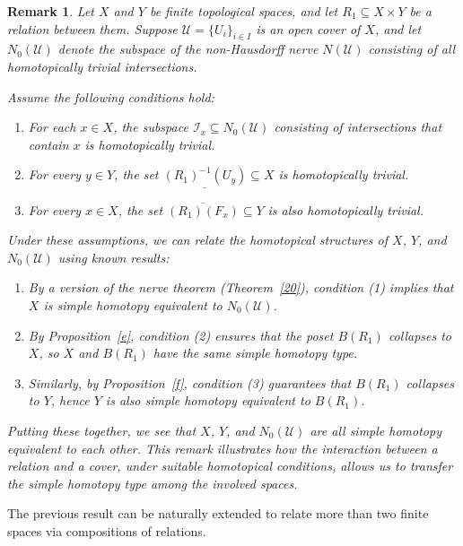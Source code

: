 \documentclass[12pt,a4paper,twoside, reqno, tbtags]{article}
\numberwithin{equation}{section}
\newtheorem{remark}{Remark}[section]
\begin{document}
\begin{remark}\label{22}
	Let \( X \) and \( Y \) be finite topological spaces, and let \( R_1 \subseteq X \times Y \) be a relation between them. Suppose \( \mathcal{U} = \{U_i\}_{i \in I} \) is an open cover of \( X \), and let \( N_0(\mathcal{U}) \) denote the subspace of the non-Hausdorff nerve \( N(\mathcal{U}) \) consisting of all homotopically trivial intersections.
	
	Assume the following conditions hold:
	\begin{enumerate}
		\item For each \( x \in X \), the subspace \( \mathcal{I}_x \subseteq N_0(\mathcal{U}) \) consisting of intersections that contain \( x \) is homotopically trivial.
		\item For every \( y \in Y \), the set \( \underline{(R_1)^{-1}(U_y)} \subseteq X \) is homotopically trivial.
		\item For every \( x \in X \), the set \( \overline{(R_1)(F_x)} \subseteq Y \) is also homotopically trivial.
	\end{enumerate}
	
	Under these assumptions, we can relate the homotopical structures of \( X \), \( Y \), and \( N_0(\mathcal{U}) \) using known results:
	\begin{enumerate}[label=\alph*.]
		\item By a version of the nerve theorem (Theorem~\ref{20}), condition (1) implies that \( X \) is simple homotopy equivalent to \( N_0(\mathcal{U}) \).
		\item By Proposition~\ref{e}, condition (2) ensures that the poset \( B(R_1) \) collapses to \( X \), so \( X \) and \( B(R_1) \) have the same simple homotopy type.
		\item Similarly, by Proposition~\ref{f}, condition (3) guarantees that \( B(R_1) \) collapses to \( Y \), hence \( Y \) is also simple homotopy equivalent to \( B(R_1) \).
	\end{enumerate}
	
	Putting these together, we see that \( X \), \( Y \), and \( N_0(\mathcal{U}) \) are all simple homotopy equivalent to each other. This remark illustrates how the interaction between a relation and a cover, under suitable homotopical conditions, allows us to transfer the simple homotopy type among the involved spaces.
\end{remark}
    \noindent The previous result can be naturally extended to relate more than two finite spaces via compositions of relations.
\end{document}
